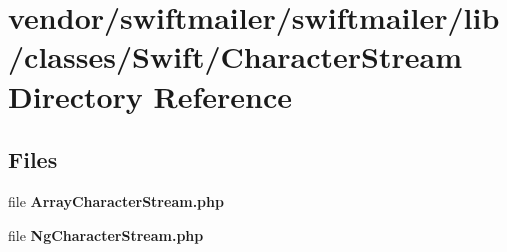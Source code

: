 \section{vendor/swiftmailer/swiftmailer/lib/classes/\+Swift/\+Character\+Stream Directory Reference}
\label{dir_5929688dc16de1080f3ae343bb17cd42}
\subsection*{Files}
\begin{DoxyCompactItemize}
\item 
file {\bf Array\+Character\+Stream.\+php}
\item 
file {\bf Ng\+Character\+Stream.\+php}
\end{DoxyCompactItemize}
